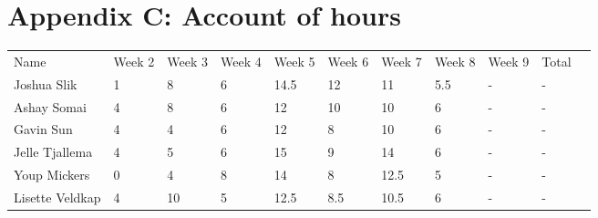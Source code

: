 \chapter*{Appendix C: Account of hours}

\begin{table}[h]
\begin{tabular}{| l | l | l | l | l | l | l | l | l | l | l}
 Name & Week 2 & Week 3 & Week 4 & Week 5 & Week 6 & Week 7 & Week 8 & Week 9 & Total & \\
 Joshua Slik & 1 & 8 & 6 & 14.5 & 12 & 11 & 5.5 & - & - & \\
 Ashay Somai & 4 & 8 & 6 & 12 & 10 & 10 & 6 & - & - & \\
 Gavin Sun & 4 & 4 & 6 & 12 & 8 & 10 & 6 & - & - & \\
 Jelle Tjallema & 4 & 5 & 6 & 15 & 9 & 14 & 6 & - & - & \\
 Youp Mickers & 0 & 4 & 8 & 14 & 8 & 12.5 & 5 & - & - & \\
 Lisette Veldkap & 4 & 10 & 5 & 12.5 & 8.5 & 10.5 & 6 & - & - & \\
\end{tabular}
\end{table}